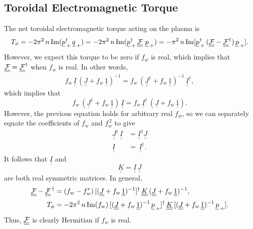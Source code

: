 \documentclass[12pt,prb,aps,notitlepage]{revtex4-1}
\begin{document}
\subsection{Toroidal Electromagnetic Torque}
The net toroidal electromagnetic torque acting on the plasma is
\begin{equation}\label{e85}
T_\phi=-2\pi^2\,n\, {\rm Im}(\underline{p}_{\,+}^\dag\,\underline{q}_{\,+})= -2\pi^2\,n\, {\rm Im}(\underline{p}_{\,+}^\dag\,\underline{\underline{\cal F}}\,\,\underline{p}_{\,+})
=-\pi^2\,n\,{\rm Im}[\underline{p}_{\,+}^\dag\,(\underline{\underline{\cal F}}-\underline{\underline{\cal F}}^\dag)\,\underline{p}_{\,+}].
\end{equation}
However, we expect this torque to be zero if $f_w$ is real, which implies that $\underline{\underline{\cal F}}=\underline{\underline{\cal F}}^\dag$
when $f_w$ is real. In other words,
\begin{align}
f_w\,\underline{\underline{I}}\,(\underline{\underline{J}}+ f_w\,\underline{\underline{1}})^{-1} =f_w\,(\underline{\underline{J}}^\dag+ f_w\,\underline{\underline{1}})^{-1}\,
\underline{\underline{I}}^\dag,
\end{align}
which implies that
\begin{equation}
f_w\,(\underline{\underline{J}}^\dag+ f_w\,\underline{\underline{1}})\,\underline{\underline{I}}=
f_w\, \underline{\underline{I}}^{\dag}\,(\underline{\underline{J}}+ f_w\,\underline{\underline{1}}).
\end{equation}
However, the previous equation holds for arbitrary real $f_w$, so we can separately equate the coefficients of $f_w$ and $f_w^{\,2}$
to give
\begin{align}\label{e90a}
\underline{\underline{J}}^\dag\,\underline{\underline{I}}&= \underline{\underline{I}}^{\dag}\underline{\underline{J}}\\[0.5ex]
\underline{\underline{I}}&=\,\underline{\underline{I}}^{\dag}.\label{e91a}
\end{align}
It follows that $\underline{\underline{I}}$ and 
\begin{equation}
\underline{\underline{K}} =  \underline{\underline{I}}\,\underline{\underline{J}}
\end{equation}
 are both real symmetric matrices. In general,
\begin{align}
\underline{\underline{\cal F}}-\underline{\underline{\cal F}}^{\,\dag}&= (f_w-f_w^\ast)\,[(\underline{\underline{J}}+ f_w\,\underline{\underline{1}})^{-1}]^\dag\,\underline{\underline{K}}\,
(\underline{\underline{J}}+ f_w\,\underline{\underline{1}})^{-1},\\[0.5ex]
T_\phi &= -2\pi^2\,n\,{\rm Im}(f_w)\,[(\underline{\underline{J}}+ f_w\,\underline{\underline{1}})^{-1}\,\underline{p}_{\,+}]^\dag\,\underline{\underline{K}}\,
[(\underline{\underline{J}}+ f_w\,\underline{\underline{1}})^{-1}\,\underline{p}_{\,+}].
\end{align}
Thus, $\underline{\underline{\cal F}}$ is clearly Hermitian if $f_w$ is real. 
\end{document}
